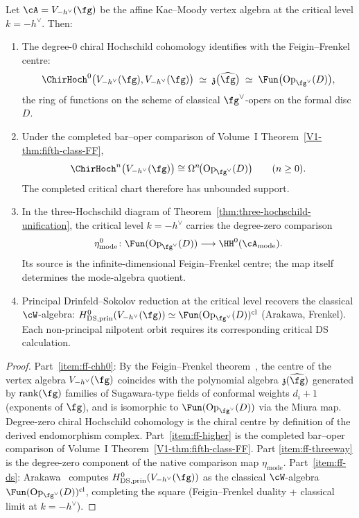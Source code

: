 \begin{theorem}%
\label{thm:feigin-frenkel-chirhoch}%
%
%
%
%
Let $\cA = V_{-h^\vee}(\fg)$ be the affine Kac--Moody vertex algebra at
the critical level $k=-h^\vee$. Then:
\begin{enumerate}[label=\textup{(\roman*)}]
\item\label{item:ff-chh0} The degree-$0$ chiral Hochschild cohomology
identifies with the Feigin--Frenkel centre:
\[
\ChirHoch^0\bigl(V_{-h^\vee}(\fg),V_{-h^\vee}(\fg)\bigr)
\;\simeq\;
\mathfrak z\bigl(\widehat{\fg}\bigr)
\;\simeq\;
\Fun\bigl(\mathrm{Op}_{\fg^\vee}(D)\bigr),
\]
the ring of functions on the scheme of classical $\fg^\vee$-opers on
the formal disc $D$.
\item\label{item:ff-higher} Under the completed bar--oper comparison
of Volume~I Theorem~\ref*{V1-thm:fifth-class-FF},
\[
 \ChirHoch^n\bigl(V_{-h^\vee}(\fg)\bigr)
 \cong \Omega^n\!\bigl(\mathrm{Op}_{\fg^\vee}(D)\bigr)
 \qquad(n\geq0).
\]
The completed critical chart therefore has unbounded support.
\item\label{item:ff-threeway} In the three-Hochschild diagram of
Theorem~\ref{thm:three-hochschild-unification}, the critical level
$k=-h^\vee$ carries the degree-zero comparison
\[
 \eta_{\mathrm{mode}}^0\colon
 \Fun(\mathrm{Op}_{\fg^\vee}(D))
 \longrightarrow \HH^0(\cA_{\mathrm{mode}}).
\]
Its source is the infinite-dimensional Feigin--Frenkel centre; the
map itself determines the mode-algebra quotient.
\item\label{item:ff-ds} Principal Drinfeld--Sokolov reduction at the
critical level recovers the classical $\cW$-algebra:
$H^0_{\mathrm{DS,prin}}(V_{-h^\vee}(\fg))\simeq
\Fun(\mathrm{Op}_{\fg^\vee}(D))^{\mathrm{cl}}$ (Arakawa, Frenkel).
Each non-principal nilpotent orbit requires its corresponding critical
DS calculation.
\end{enumerate}
\end{theorem}

\begin{proof}
Part~\ref{item:ff-chh0}: By the Feigin--Frenkel
theorem~\cite{FeiginFrenkel1992,Frenkel2007}, the centre of the vertex
algebra $V_{-h^\vee}(\fg)$ coincides with the polynomial algebra
$\mathfrak z(\widehat\fg)$ generated by $\mathrm{rank}(\fg)$ families of
Sugawara-type fields of conformal weights $d_i+1$ (exponents of $\fg$),
and is isomorphic to $\Fun(\mathrm{Op}_{\fg^\vee}(D))$ via the
Miura map.  Degree-zero chiral Hochschild cohomology is the chiral
centre by definition of the derived endomorphism complex.
Part~\ref{item:ff-higher} is the completed bar--oper comparison of
Volume~I Theorem~\ref*{V1-thm:fifth-class-FF}.  Part
\ref{item:ff-threeway} is the degree-zero component of the native
comparison map $\eta_{\mathrm{mode}}$.
Part~\ref{item:ff-ds}: Arakawa~\cite{Arakawa15} computes
$H^0_{\mathrm{DS,prin}}(V_{-h^\vee}(\fg))$ as the classical
$\cW$-algebra $\Fun(\mathrm{Op}_{\fg^\vee}(D))^{\mathrm{cl}}$,
completing the square (Feigin--Frenkel duality + classical limit at
$k=-h^\vee$).
\end{proof}

